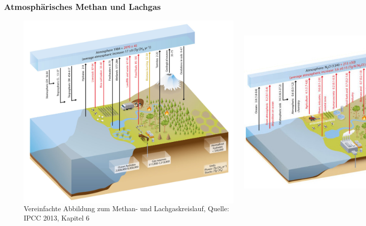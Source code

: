 \begin{frame}
	\frametitle{Atmosphärisches Methan und Lachgas}
	\begin{figure}
		\begin{columns}
				\includegraphics[width=\linewidth]{bilder/IPCC_Cycles_methane.jpg}

				\includegraphics[width=1.1\linewidth]{bilder/IPCC_Cycles_n2o_.jpg}
		\end{columns}
		\caption{Vereinfachte Abbildung zum Methan- und Lachgaskreislauf, Quelle: IPCC 2013, Kapitel 6}
	\end{figure}


\end{frame}
